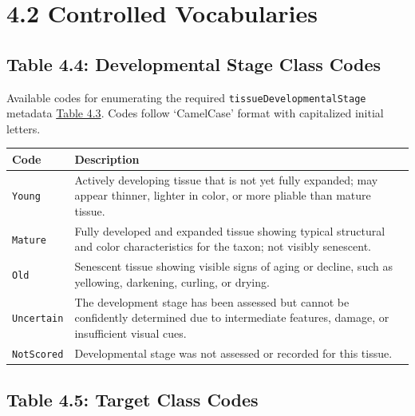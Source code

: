 \documentclass[
  letterpaper,
  DIV=11,
  numbers=noendperiod]{scrreprt}
\begin{document}
\section{4.2 Controlled Vocabularies}\label{section4-2}

\subsection{Table 4.4: Developmental Stage Class Codes}\label{tbl-4-4}

Available codes for enumerating the required
\texttt{tissueDevelopmentalStage} metadata \hyperref[tbl-4-3]{Table
4.3}. Codes follow `CamelCase' format with capitalized initial letters.

\begin{longtable}[]{@{}
  >{\raggedright\arraybackslash}p{}
  >{\raggedright\arraybackslash}p{}@{}}
\toprule\noalign{}
\begin{minipage}[b]{\linewidth}\raggedright
Code
\end{minipage} & \begin{minipage}[b]{\linewidth}\raggedright
Description
\end{minipage} \\
\midrule\noalign{}
\endhead
\bottomrule\noalign{}
\endlastfoot
\texttt{Young} & Actively developing tissue that is not yet fully
expanded; may appear thinner, lighter in color, or more pliable than
mature tissue. \\
\texttt{Mature} & Fully developed and expanded tissue showing typical
structural and color characteristics for the taxon; not visibly
senescent. \\
\texttt{Old} & Senescent tissue showing visible signs of aging or
decline, such as yellowing, darkening, curling, or drying. \\
\texttt{Uncertain} & The development stage has been assessed but cannot
be confidently determined due to intermediate features, damage, or
insufficient visual cues. \\
\texttt{NotScored} & Developmental stage was not assessed or recorded
for this tissue. \\
\end{longtable}

\subsection{Table 4.5: Target Class Codes}\label{tbl-4-5}
\end{document}
